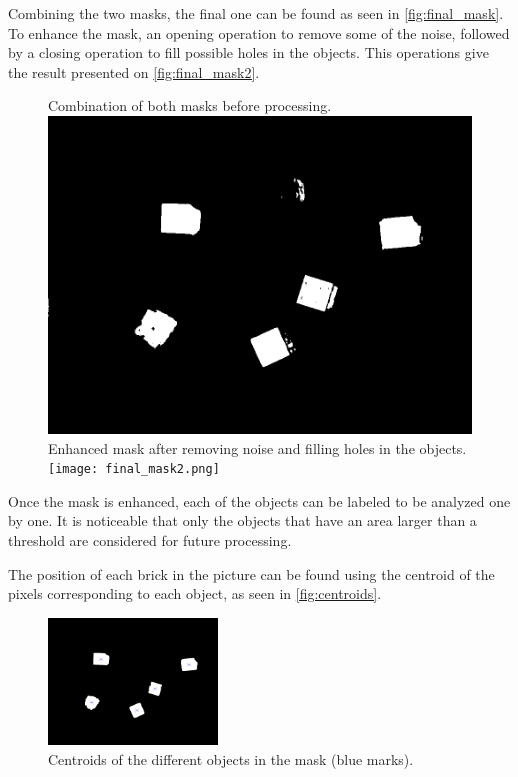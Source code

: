 Combining the two masks, the final one can be found as seen in \autoref{fig:final_mask}. To enhance the mask, an opening operation to remove some of the noise, followed by a closing operation to fill possible holes in the objects. This operations give the result presented on \autoref{fig:final_mask2}.

\begin{figure}[H]
    \captionbox  %
    {
        Combination of both masks before processing.             
        \label{fig:final_mask}                                  
    }                                                                 
    {                                                                  
        \includegraphics[width=.4\textwidth]{figures/final_mask.png}         
    }                                                                    
    \hspace{5pt}                                                          
    \captionbox
    {       
        Enhanced mask after removing noise and filling holes in the objects.
        \label{fig:final_mask2}                                     
    }
    {
        \texttt{[image: final\_mask2.png]}            
    }                                                                             
\end{figure}

Once the mask is enhanced, each of the objects can be labeled to be analyzed one by one. It is noticeable that only the objects that have an area larger than a threshold are considered for future processing.

The position of each brick in the picture can be found using the centroid of the pixels corresponding to each object, as seen in \autoref{fig:centroids}.

\begin{figure}[H]
    \includegraphics[width=0.4\textwidth]{figures/centroids.png}
    \caption{Centroids of the different objects in the mask (blue marks).}
    \label{fig:centroids}
\end{figure}

